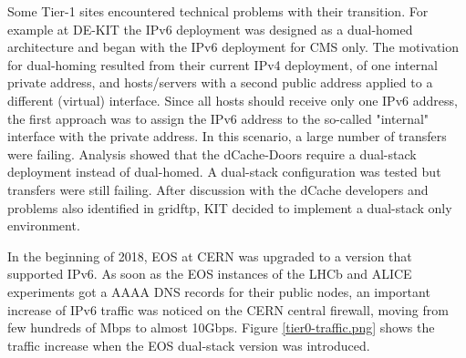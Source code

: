 Some Tier-1 sites encountered technical problems with their transition.
For example at DE-KIT the IPv6 deployment was designed as a dual-homed architecture
and began with the IPv6 deployment for 
CMS only. The motivation for dual-homing resulted from their current IPv4 deployment,
of one internal private address, and 
hosts/servers with a second public address applied to a different (virtual) interface. 
Since all hosts should receive only one IPv6 address, the first approach was to assign the IPv6 address to the so-called "internal" interface with the private address. 
In this scenario, a large number of transfers were failing. 
Analysis showed that the dCache-Doors require a dual-stack deployment instead of dual-homed. A dual-stack configuration was tested but transfers were still failing. After discussion with the dCache developers and problems also identified in gridftp, KIT decided to implement a dual-stack only environment.
  
In the beginning of 2018, EOS at CERN was upgraded to a version that supported IPv6.  
As soon as the EOS instances of the LHCb and ALICE experiments got a AAAA DNS records for their public nodes, an important increase of IPv6 traffic was noticed on the CERN central firewall, moving from few hundreds of Mbps to almost 10Gbps. 
Figure \ref{tier0-traffic.png} shows the traffic increase when the EOS dual-stack version was introduced.
 
